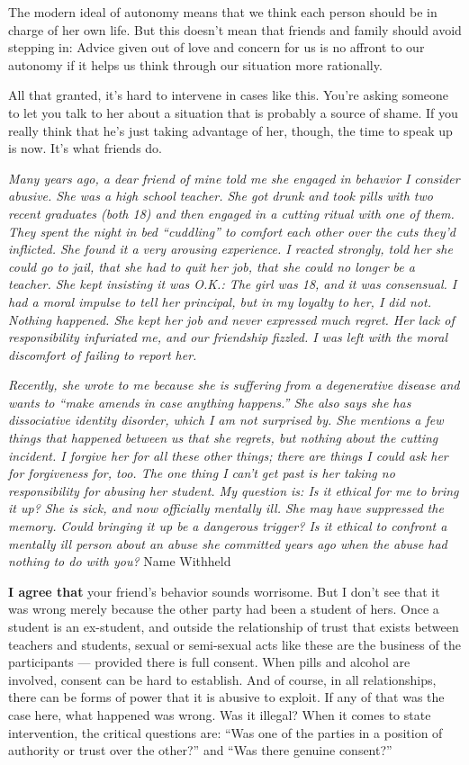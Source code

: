 The modern ideal of autonomy means that we think each person should be
in charge of her own life. But this doesn't mean that friends and family
should avoid stepping in: Advice given out of love and concern for us is
no affront to our autonomy if it helps us think through our situation
more rationally.

All that granted, it's hard to intervene in cases like this. You're
asking someone to let you talk to her about a situation that is probably
a source of shame. If you really think that he's just taking advantage
of her, though, the time to speak up is now. It's what friends do.

\emph{Many years ago, a dear friend of mine told me she engaged in
behavior I consider abusive. She was a high school teacher. She got
drunk and took pills with two recent graduates (both 18) and then
engaged in a cutting ritual with one of them. They spent the night in
bed ``cuddling'' to comfort each other over the cuts they'd inflicted.
She found it a very arousing experience. I reacted strongly, told her
she could go to jail, that she had to quit her job, that she could no
longer be a teacher. She kept insisting it was O.K.: The girl was 18,
and it was consensual. I had a moral impulse to tell her principal, but
in my loyalty to her, I did not. Nothing happened. She kept her job and
never expressed much regret. Her lack of responsibility infuriated me,
and our friendship fizzled. I was left with the moral discomfort of
failing to report her.}

\emph{Recently, she wrote to me because she is suffering from a
degenerative disease and wants to ``make amends in case anything
happens.'' She also says she has dissociative identity disorder, which I
am not surprised by. She mentions a few things that happened between us
that she regrets, but nothing about the cutting incident. I forgive her
for all these other things; there are things I could ask her for
forgiveness for, too. The one thing I can't get past is her taking no
responsibility for abusing her student. My question is: Is it ethical
for me to bring it up? She is sick, and now officially mentally ill. She
may have suppressed the memory. Could bringing it up be a dangerous
trigger? Is it ethical to confront a mentally ill person about an abuse
she committed years ago when the abuse had nothing to do with you?} Name
Withheld

\textbf{I agree that} your friend's behavior sounds worrisome. But I
don't see that it was wrong merely because the other party had been a
student of hers. Once a student is an ex-student, and outside the
relationship of trust that exists between teachers and students, sexual
or semi-sexual acts like these are the business of the participants ---
provided there is full consent. When pills and alcohol are involved,
consent can be hard to establish. And of course, in all relationships,
there can be forms of power that it is abusive to exploit. If any of
that was the case here, what happened was wrong. Was it illegal? When it
comes to state intervention, the critical questions are: ``Was one of
the parties in a position of authority or trust over the other?'' and
``Was there genuine consent?''

